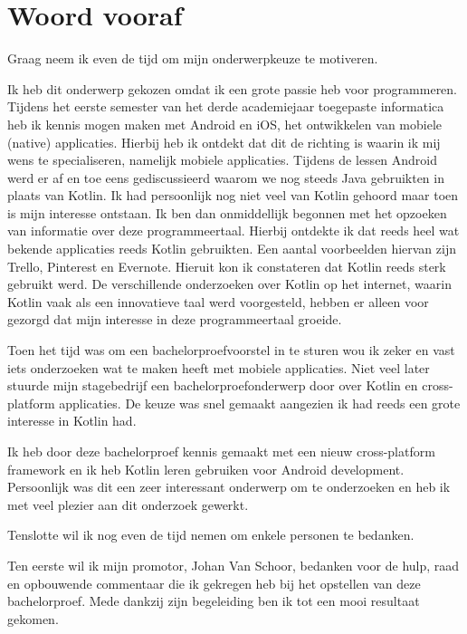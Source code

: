 
\chapter*{Woord vooraf}
\label{ch:voorwoord}

Graag neem ik even de tijd om mijn onderwerpkeuze te motiveren.

Ik heb dit onderwerp gekozen omdat ik een grote passie heb voor programmeren. Tijdens het eerste semester van het derde academiejaar toegepaste informatica heb ik kennis mogen maken met Android en iOS, het ontwikkelen van mobiele (native) applicaties. Hierbij heb ik ontdekt dat dit de richting is waarin ik mij wens te specialiseren, namelijk mobiele applicaties. Tijdens de lessen Android werd er af en toe eens gediscussieerd waarom we nog steeds Java gebruikten in plaats van Kotlin. Ik had persoonlijk nog niet veel van Kotlin gehoord maar toen is mijn interesse ontstaan. Ik ben dan onmiddellijk begonnen met het opzoeken van informatie over deze programmeertaal. Hierbij ontdekte ik dat reeds heel wat bekende applicaties reeds Kotlin gebruikten. Een aantal voorbeelden hiervan zijn Trello, Pinterest en Evernote. Hieruit kon ik constateren dat Kotlin reeds sterk gebruikt werd. De verschillende onderzoeken over Kotlin op het internet, waarin Kotlin vaak als een innovatieve taal werd voorgesteld, hebben er alleen voor gezorgd dat mijn interesse in deze programmeertaal groeide.

Toen het tijd was om een bachelorproefvoorstel in te sturen wou ik zeker en vast iets onderzoeken wat te maken heeft met mobiele applicaties. Niet veel later stuurde mijn stagebedrijf een bachelorproefonderwerp door over Kotlin en cross-platform applicaties. De keuze was snel gemaakt aangezien ik had reeds een grote interesse in Kotlin had. 

Ik heb door deze bachelorproef kennis gemaakt met een nieuw cross-platform framework en ik heb Kotlin leren gebruiken voor Android development. Persoonlijk was dit een zeer interessant onderwerp om te onderzoeken en heb ik met veel plezier aan dit onderzoek gewerkt.

Tenslotte wil ik nog even de tijd nemen om enkele personen te bedanken.

Ten eerste wil ik mijn promotor, Johan Van Schoor, bedanken voor de hulp, raad en opbouwende commentaar die ik gekregen heb bij het opstellen van deze bachelorproef. Mede dankzij zijn begeleiding ben ik tot een mooi resultaat gekomen.

